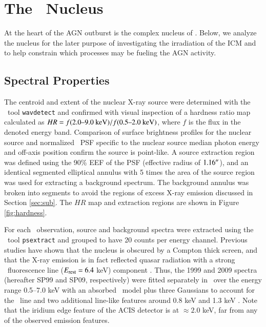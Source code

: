 \documentclass[referee,traditabstract]{aa}
\begin{document}
\section{The \irs\ Nucleus}
\label{sec:nucleus}

At the heart of the AGN outburst is the complex nucleus of
\irs. Below, we analyze the nucleus for the later purpose of
investigating the irradiation of the ICM and to help constrain which
processes may be fueling the AGN activity.

\subsection{Spectral Properties}

The centroid and extent of the nuclear X-ray source were determined
with the \ciao\ tool {\tt wavdetect} and confirmed with visual
inspection of a hardness ratio map calculated as $HR = f(2.0 \mbox{--} 9.0
~\mbox{\ensuremath{\rm{keV}}}) / f(0.5 \mbox{--} 2.0 ~\mbox{\ensuremath{\rm{keV}}})$, where $f$ is the flux in the denoted
energy band. Comparison of surface brightness profiles for the nuclear
source and normalized \cxo\ PSF specific to the nuclear source median
photon energy and off-axis position confirm the source is
point-like. A source extraction region was defined using the 90\% EEF
of the PSF (effective radius of $1.16\rm{^\prime}\hskip -0.1em\rm{^\prime}$), and an identical
segmented elliptical annulus with 5 times the area of the source
region was used for extracting a background spectrum. The background
annulus was broken into segments to avoid the regions of excess X-ray
emission discussed in Section \ref{sec:sub}. The $HR$ map and
extraction regions are shown in Figure \ref{fig:hardness}.

For each \cxo\ observation, source and background spectra were
extracted using the \ciao\ tool {\tt psextract} and grouped to have 20
counts per energy channel. Previous studies have shown that the
nucleus is obscured by a Compton thick screen, and that the X-ray
emission is in fact reflected quasar radiation with a strong
\feka\ fluorescence line ($E_{\rm{rest}} = 6.4$ keV) component
\citep[\eg][]{2000A&A...353..910F, 2001MNRAS.321L..15I}. Thus, the
1999 and 2009 spectra (hereafter SP99 and SP09, respectively) were
fitted separately in \xspec\ over the energy range 0.5--7.0 keV with
an absorbed \pexrav\ model \citep{pexrav} plus three Gaussians to
account for the \feka\ line and two additional line-like features
around 0.8 keV and 1.3 keV \citep[see
  also][]{2001MNRAS.321L..15I}. Note that the iridium edge feature of
the ACIS detector is at $\approx 2.0$ keV, far from any of the
observed emission features.
\end{document}
